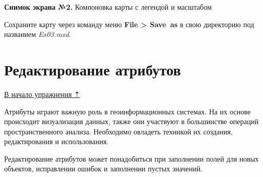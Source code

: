 \documentclass[]{book}
\theoremstyle{definition}
\theoremstyle{definition}
\theoremstyle{definition}
\theoremstyle{remark}
\begin{document}
\textbf{Снимок экрана №2.} Компоновка карты с легендой и масштабом

Сохраните карту через команду меню \textbf{File \textgreater{} Save~as}
в свою директорию под названием \emph{Ex03.mxd}.

\hypertarget{map-design-quaternary-attributes}{%
\section{Редактирование
атрибутов}\label{map-design-quaternary-attributes}}

\protect\hyperlink{map-design-quaternary}{В начало упражнения ⇡}

Атрибуты играют важную роль в геоинформационных системах. На их основе
происходит визуализация данных, также они участвуют в большинстве
операций пространственного анализа. Необходимо овладеть техникой их
создания, редактирования и использования.

Редактирование атрибутов может понадобиться при заполнении полей для
новых объектов, исправлении ошибок и заполнении пустых значений.
\end{document}
